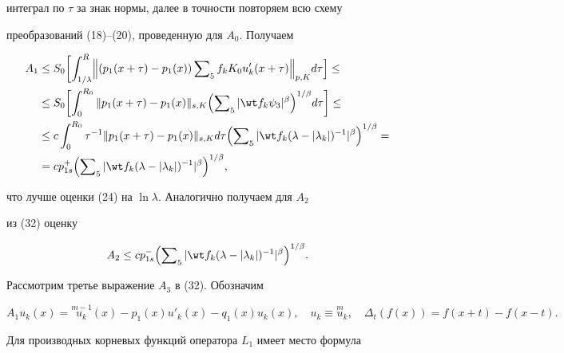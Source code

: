 {интеграл по $\tau$ за знак нормы, далее в точности повторяем всю схему


преобразований (18)--(20), проведенную для $A_0$. Получаем


\begin{align}


A_1&\le S_0\biggl[\int^R_{1/\lambda}\Bigl\|(p_1(x+\tau)-


p_1(x))\sumn_5 f_k K_0u'_k(x+\tau)\Bigr\|_{p,K}d\tau\Bigr]\le\notag\\


&\le S_0\biggl[\int^{R_0}_0\|p_1(x+\tau)-p_1(x)\|_{s,K}


\Bigl(\sumn_5|\wt f_k\psi_3|^\beta\Bigr)^{1/\beta}d\tau\biggr]


\le\notag\\


&\le c\int^{R_0}_0 \tau^{-1}\|p_1(x+\tau)-p_1(x)\|_{s,K}d\tau


\Bigl(\sumn_5|\wt f_k(\lambda-|\lambda_k|)^{-1}|^\beta


\Bigr)^{1/\beta}=\notag\\


&=c p^+_{1s}\Bigl(\sumn_5|\wt f_k(\lambda-|\lambda_k|)^{-1}|^\beta


\Bigr)^{1/\beta},


\end{align}


что лучше оценки (24) на $\ln\lambda$. Аналогично получаем для $A_2$


из (32) оценку


\begin{equation}


A_2\le c p^-_{1s}\Bigl(\sumn_5|\wt f_k


(\lambda-|\lambda_k|)^{-1}|^\beta\Bigr)^{1/\beta}.


\end{equation}





Рассмотрим третье выражение $A_3$ в (32). Обозначим


$$


A_1u_k(x)=\overset{m-1}{u_k}{}(x)-p_1(x)u'_k(x)-q_1(x)


u_k(x),\quad u_k\equiv\overset{m}{u}{}_k,\quad


\Delta_t(f(x))=f(x+t)-f(x-t).


$$


Для производных корневых функций оператора $L_1$ имеет место формула


}
